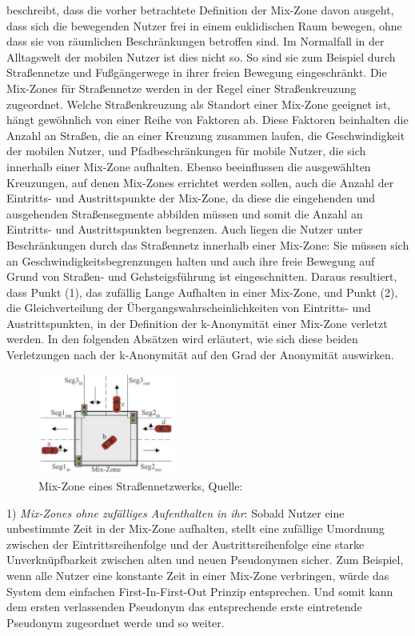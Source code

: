 \cite{Palanisamy2011} beschreibt, dass die vorher betrachtete Definition der Mix-Zone davon ausgeht, dass sich die bewegenden Nutzer frei in einem euklidischen Raum bewegen, ohne dass sie von räumlichen Beschränkungen betroffen sind. Im Normalfall in der Alltagswelt der mobilen Nutzer ist dies nicht so. So sind sie zum Beispiel durch Straßennetze und Fußgängerwege in ihrer freien Bewegung eingeschränkt. Die Mix-Zones für Straßennetze werden in der Regel einer Straßenkreuzung zugeordnet. Welche Straßenkreuzung als Standort einer Mix-Zone geeignet ist, hängt gewöhnlich von einer Reihe von Faktoren ab. Diese Faktoren beinhalten die Anzahl an Straßen, die an einer Kreuzung zusammen laufen, die Geschwindigkeit der mobilen Nutzer, und Pfadbeschränkungen für mobile Nutzer, die sich innerhalb einer Mix-Zone aufhalten. Ebenso beeinflussen die ausgewählten Kreuzungen, auf denen Mix-Zones errichtet werden sollen, auch die Anzahl der Eintritts- und Austrittspunkte der Mix-Zone, da diese die eingehenden und ausgehenden Straßensegmente abbilden müssen und somit die Anzahl an Eintritts- und Austrittspunkten begrenzen. Auch liegen die Nutzer unter Beschränkungen durch das Straßennetz innerhalb einer Mix-Zone: Sie müssen sich an Geschwindigkeitsbegrenzungen halten und auch ihre freie Bewegung auf Grund von Straßen- und Gehsteigsführung ist eingeschnitten. Daraus resultiert, dass Punkt (1), das zufällig Lange Aufhalten in einer Mix-Zone, und Punkt (2), die Gleichverteilung der Übergangswahrscheinlichkeiten von Eintritts- und Austrittspunkten, in der Definition der k-Anonymität einer Mix-Zone verletzt werden. In den folgenden Absätzen wird erläutert, wie sich diese beiden Verletzungen nach \cite{Chow2011} der k-Anonymität auf den Grad der Anonymität auswirken.

\begin{figure}[!h]
	\centering
	\includegraphics[width=0.4\textwidth]{Bilder/MixZoneNetwork.PNG}
	\caption{Mix-Zone eines Straßennetzwerks, Quelle: \protect\cite{Chow2011}}
	\label{fig_MixSrasse}
\end{figure}

1)	\textit{Mix-Zones ohne zufälliges Aufenthalten in ihr}: Sobald Nutzer eine unbestimmte Zeit in der Mix-Zone aufhalten, stellt eine zufällige Umordnung zwischen der Eintrittsreihenfolge und der Austrittsreihenfolge eine starke Unverknüpfbarkeit zwischen alten und neuen Pseudonymen sicher. Zum Beispiel, wenn alle Nutzer eine konstante Zeit in einer Mix-Zone verbringen, würde das System dem einfachen First-In-First-Out Prinzip entsprechen. Und somit kann dem ersten verlassenden Pseudonym das entsprechende erste eintretende Pseudonym zugeordnet werde und so weiter.

